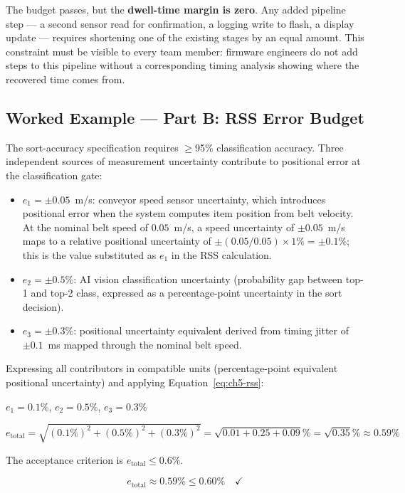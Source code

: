 The budget passes, but the \textbf{dwell-time margin is zero}.
Any added pipeline step --- a second sensor read for confirmation, a logging write to flash, a display update --- requires shortening one of the existing stages by an equal amount.
This constraint must be visible to every team member: firmware engineers do not add steps to this pipeline without a corresponding timing analysis showing where the recovered time comes from.

\subsection{Worked Example --- Part B: RSS Error Budget}
\label{subsec:ch5-worked-rss}

The sort-accuracy specification requires $\geq$95\% classification accuracy.
Three independent sources of measurement uncertainty contribute to positional error at the classification gate:

\begin{itemize}
  \item $e_1 = \pm 0.05$~m/s: conveyor speed sensor uncertainty, which introduces positional error when the system computes item position from belt velocity.
        At the nominal belt speed of $0.05$~m/s, a speed uncertainty of $\pm 0.05$~m/s maps to a relative positional uncertainty of $\pm(0.05/0.05)\times 1\% = \pm 0.1\%$; this is the value substituted as $e_1$ in the RSS calculation.
  \item $e_2 = \pm 0.5\%$: AI vision classification uncertainty (probability gap between top-1 and top-2 class, expressed as a percentage-point uncertainty in the sort decision).
  \item $e_3 = \pm 0.3\%$: positional uncertainty equivalent derived from timing jitter of $\pm 0.1$~ms mapped through the nominal belt speed.
\end{itemize}

Expressing all contributors in compatible units (percentage-point equivalent positional uncertainty) and applying Equation~\ref{eq:ch5-rss}:

\noindent $e_1 = 0.1\%$, $e_2 = 0.5\%$, $e_3 = 0.3\%$

\[
  e_{\text{total}} = \sqrt{(0.1\%)^2 + (0.5\%)^2 + (0.3\%)^2}
  = \sqrt{0.01 + 0.25 + 0.09}\%
  = \sqrt{0.35}\%
  \approx 0.59\%
\]

The acceptance criterion is $e_{\text{total}} \leq 0.6\%$.

\[
  e_{\text{total}} \approx 0.59\% \leq 0.60\% \quad \checkmark
\]

